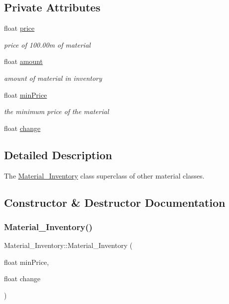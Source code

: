 \subsection*{Private Attributes}
\begin{DoxyCompactItemize}
\item 
float \mbox{\hyperlink{classMaterial__Inventory_a32622250fa5246e1ee091d3fd8dd72ff}{price}}
\begin{DoxyCompactList}\small\item\em price of 100.\+00m of material \end{DoxyCompactList}\item 
float \mbox{\hyperlink{classMaterial__Inventory_a928c45234f051861431e8adc1bd4f368}{amount}}
\begin{DoxyCompactList}\small\item\em amount of material in inventory \end{DoxyCompactList}\item 
float \mbox{\hyperlink{classMaterial__Inventory_afb28e18e6100fb9ef18c283866759bb3}{min\+Price}}
\begin{DoxyCompactList}\small\item\em the minimum price of the material \end{DoxyCompactList}\item 
float \mbox{\hyperlink{classMaterial__Inventory_a3fbae5816d7f24c3715f8c7d2cc842a6}{change}}
\end{DoxyCompactItemize}


\subsection{Detailed Description}
The \mbox{\hyperlink{classMaterial__Inventory}{Material\+\_\+\+Inventory}} class superclass of other material classes. 

\subsection{Constructor \& Destructor Documentation}
\mbox{\label{classMaterial__Inventory_a996e5441abe78653a8cb386a499a4063}} 
\subsubsection{\texorpdfstring{Material\_Inventory()}{Material\_Inventory()}}
{\footnotesize\ttfamily Material\+\_\+\+Inventory\+::\+Material\+\_\+\+Inventory (\begin{DoxyParamCaption}\item[{float}]{min\+Price,  }\item[{float}]{change }\end{DoxyParamCaption})}



